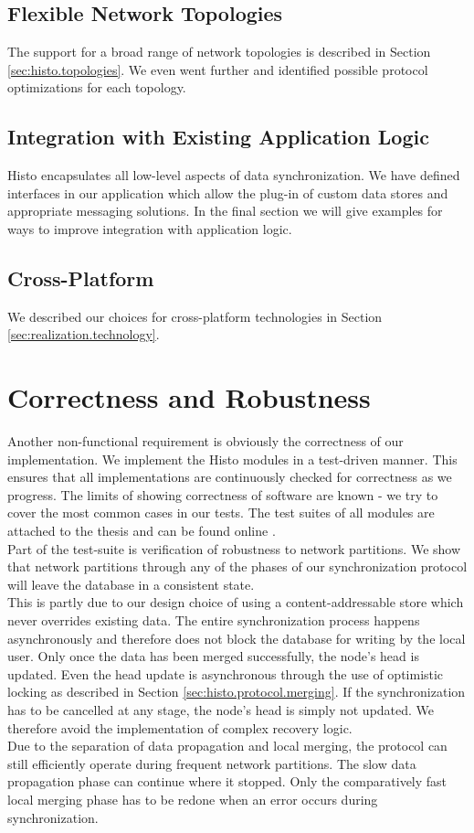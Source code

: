 \subsection*{Flexible Network Topologies}
The support for a broad range of network topologies is described in Section \ref{sec:histo.topologies}.
We even went further and identified possible protocol optimizations for each topology.

\subsection*{Integration with Existing Application Logic}
Histo encapsulates all low-level aspects of data synchronization.
We have defined interfaces in our application which allow the plug-in of custom data stores and appropriate messaging solutions.
In the final section we will give examples for ways to improve integration with application logic.

\subsection*{Cross-Platform}
We described our choices for cross-platform technologies in Section \ref{sec:realization.technology}.

\section{Correctness and Robustness}
Another non-functional requirement is obviously the correctness of our implementation.
We implement the Histo modules in a test-driven manner.
This ensures that all implementations are continuously checked for correctness as we progress.
The limits of showing correctness of software are known - we try to cover the most common cases in our tests.
The test suites of all modules are attached to the thesis and can be found online \cite{histo-source}.
\\

Part of the test-suite is verification of robustness to network partitions.
We show that network partitions through any of the phases of our synchronization protocol will leave the database in a consistent state.\\
This is partly due to our design choice of using a content-addressable store which never overrides existing data.
The entire synchronization process happens asynchronously and therefore does not block the database for writing by the local user.
Only once the data has been merged successfully, the node's head is updated.
Even the head update is asynchronous through the use of optimistic locking as described in Section \ref{sec:histo.protocol.merging}.
If the synchronization has to be cancelled at any stage, the node's head is simply not updated.
We therefore avoid the implementation of complex recovery logic.\\
Due to the separation of data propagation and local merging, the protocol can still efficiently operate during frequent network partitions.
The slow data propagation phase can continue where it stopped.
Only the comparatively fast local merging phase has to be redone when an error occurs during synchronization.

